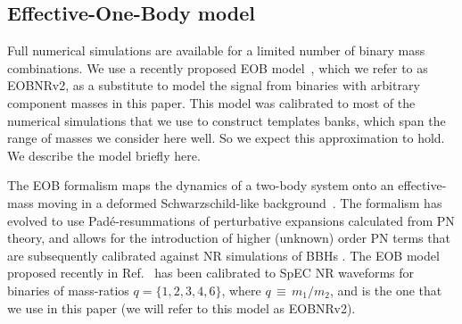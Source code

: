 \documentclass[aps,
prd,
twocolumn,
superscriptaddress,
lengthcheck,showpacs,letterpaper,nofootinbib,
floatfix]{revtex4-1}
\begin{document}
\subsection{Effective-One-Body model}\label{s2:EOBwaveforms}


Full numerical simulations are available for a limited number of binary 
mass combinations. We use a recently proposed EOB 
model~\cite{BuonannoEOBv2Main}, which we refer to as EOBNRv2, as a substitute
to model the signal from binaries with arbitrary component masses
in this paper. This model was calibrated to most of the numerical simulations
that we use to construct templates banks, which span the range of masses 
we consider here well. So we expect this approximation to hold. We describe the
model briefly here.

The EOB formalism maps the dynamics of a two-body system onto an effective-mass
moving in a deformed Schwarzschild-like background~\citep{EOBOriginalBuonannoDamour}.
The formalism has evolved to use Pad\'{e}-resummations of perturbative 
expansions calculated from PN theory, and allows for the introduction of higher
(unknown) order PN terms that are subsequently calibrated against NR 
simulations of BBHs 
\cite{EOBdevel01,EOBdevel02,EOBNRdevel03,DamourFluxhlm01,EOBNRdevel01}. The EOB 
model proposed recently in Ref.~\citep{BuonannoEOBv2Main} has been calibrated 
to SpEC NR waveforms for binaries of mass-ratios $q=\{1,2,3,4,6\}$, where 
$q\,\equiv \, m_1/m_2$, and is the one that we use in this paper (we will refer
to this model as EOBNRv2).
\end{document}
